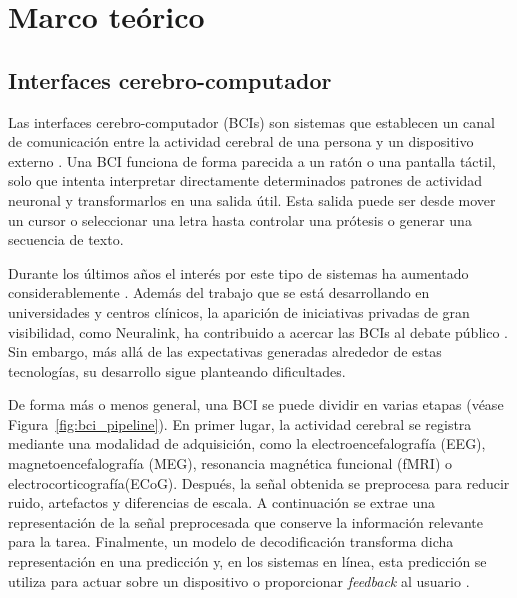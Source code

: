 
\chapter{Marco teórico}

\section{Interfaces cerebro-computador}

Las interfaces cerebro-computador (BCIs) son sistemas que establecen un canal de comunicación entre la actividad cerebral de una persona
y un dispositivo externo \cite{wolpaw2002bci}. Una BCI funciona de forma parecida a un ratón o una pantalla táctil, solo que intenta interpretar directamente determinados patrones de actividad neuronal y transformarlos en una salida útil. Esta salida puede ser desde mover un cursor o seleccionar una letra hasta controlar una prótesis o generar una secuencia de texto.

Durante los últimos años el interés por este tipo de sistemas ha aumentado considerablemente \cite{edelman2025noninvasive}. Además del trabajo que se está desarrollando en universidades y centros clínicos, la aparición de iniciativas privadas de gran visibilidad, como Neuralink, ha contribuido a acercar las BCIs al debate público \cite{musk2019neuralink}. Sin embargo, más allá de las expectativas generadas alrededor de estas tecnologías, su desarrollo sigue planteando dificultades.

De forma más o menos general, una BCI se puede dividir en varias etapas (véase Figura~\ref{fig:bci_pipeline}). En primer lugar, la actividad cerebral se registra mediante una modalidad de adquisición, como la electroencefalografía (EEG), magnetoencefalografía (MEG), resonancia magnética funcional (fMRI) o electrocorticografía(ECoG). Después, la señal obtenida se preprocesa para reducir ruido, artefactos y diferencias de escala. A continuación se extrae una representación de la señal preprocesada que conserve la información relevante para la tarea. Finalmente, un modelo de decodificación transforma dicha representación en una predicción y, en los sistemas en línea, esta predicción se utiliza para actuar sobre un dispositivo o proporcionar \emph{feedback} al usuario \cite{edelman2025noninvasive}.




